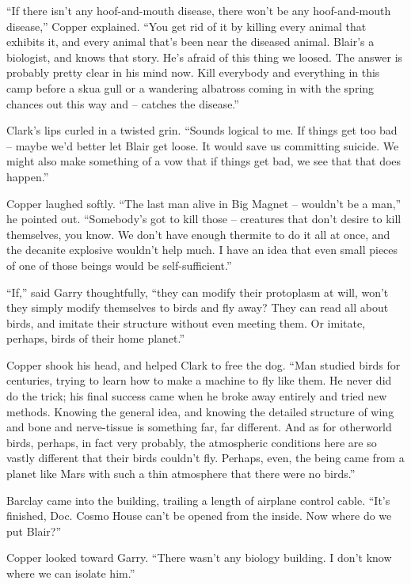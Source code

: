 \documentclass[ebook,oneside,11pt]{memoir}				%
\begin{document}
``If there isn't any hoof-and-mouth disease, there won't be any hoof-and-mouth disease,'' Copper explained. ``You get rid of it by killing every animal that exhibits it, and every animal that's been near the diseased animal. Blair's a biologist, and knows that story. He's afraid of this thing we loosed. The answer is probably pretty clear in his mind now. Kill everybody and everything in this camp before a skua gull or a wandering albatross coming in with the spring chances out this way and -- catches the disease.''

Clark's lips curled in a twisted grin. ``Sounds logical to me. If things get too bad -- maybe we'd better let Blair get loose. It would save us committing suicide. We might also make something of a vow that if things get bad, we see that that does happen.''

Copper laughed softly. ``The last man alive in Big Magnet -- wouldn't be a man,'' he pointed out. ``Somebody's got to kill those -- creatures that don't desire to kill themselves, you know. We don't have enough thermite to do it all at once, and the decanite explosive wouldn't help much. I have an idea that even small pieces of one of those beings would be self-sufficient.''

``If,'' said Garry thoughtfully, ``they can modify their protoplasm at will, won't they simply modify themselves to birds and fly away? They can read all about birds, and imitate their structure without even meeting them. Or imitate, perhaps, birds of their home planet.''

Copper shook his head, and helped Clark to free the dog. ``Man studied birds for centuries, trying to learn how to make a machine to fly like them. He never did do the trick; his final success came when he broke away entirely and tried new methods. Knowing the general idea, and knowing the detailed structure of wing and bone and nerve-tissue is something far, far different. And as for otherworld birds, perhaps, in fact very probably, the atmospheric conditions here are so vastly different that their birds couldn't fly. Perhaps, even, the being came from a planet like Mars with such a thin atmosphere that there were no birds.''

Barclay came into the building, trailing a length of airplane control cable. ``It's finished, Doc. Cosmo House can't be opened from the inside. Now where do we put Blair?''

Copper looked toward Garry. ``There wasn't any biology building. I don't know where we can isolate him.''
\end{document}
